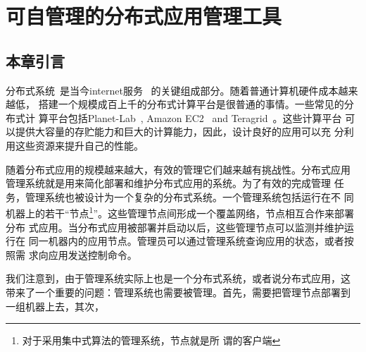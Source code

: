 \chapter{可自管理的分布式应用管理工具}
\label{chap:selfman}


%
%
%
%
%
%
%
%
%
%
%
%

\section{本章引言}

分布式系统~\cite{Ghemawat2003,DeCandia2007}是当今internet服务~
\cite{google, amazon?}的关键组成部分。随着普通计算机硬件成本越来越低，
搭建一个规模成百上千的分布式计算平台是很普通的事情。一些常见的分布式计
算平台包括Planet-Lab~\cite{Bavier2004}, Amazon
EC2~\cite{Garfinkel2007} and Teragrid~\cite{Catlett2002}。这些计算平台
可以提供大容量的存贮能力和巨大的计算能力，因此，设计良好的应用可以充
分利用这些资源来提升自己的性能。

随着分布式应用的规模越来越大，有效的管理它们越来越有挑战性。分布式应用
管理系统就是用来简化部署和维护分布式应用的系统。为了有效的完成管理
任务，管理系统也被设计为一个复杂的分布式系统。一个管理系统包括运行在不
同机器上的若干“节点\footnote{对于采用集中式算法的管理系统，节点就是所
谓的客户端}”。这些管理节点间形成一个覆盖网络，节点相互合作来部署分布
式应用。当分布式应用被部署并启动以后，这些管理节点可以监测并维护运行在
同一机器内的应用节点。管理员可以通过管理系统查询应用的状态，或者按照需
求向应用发送控制命令。

我们注意到，由于管理系统实际上也是一个分布式系统，或者说分布式应用，这
带来了一个重要的问题：管理系统也需要被管理。首先，需要把管理节点部署到
一组机器上去，其次，

